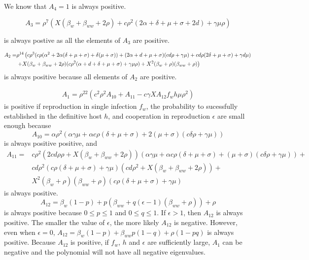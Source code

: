 \documentclass[11pt]{article}
\begin{document}
We know that $A_4 = 1$ is always positive. 

\begin{equation}
	A_3 = \rho ^7 \left(X (\beta_w + \beta_{ww}+2 \rho ) + c \rho^2  (2 \alpha +\delta +\mu +\sigma + 2 d  )+\gamma  \mu  \rho \right)
\end{equation}

is always postive as all the elements of $A_3$ are positive.

\begin{align}
	A_2 = & \rho^{14} \left(c \rho ^3 (c \rho  (\alpha ^2+2 \alpha  (\delta +\mu +\sigma )+\delta  (\mu +\sigma ))+(2 \alpha +d+\mu +\sigma ) (c d \rho +\gamma  \mu )+c d \rho  (2 \delta +\mu +\sigma )+\gamma  d \mu ) \right. \notag \\
	&\left. +X (\beta_w + \beta_{ww}+2 \rho ) (c \rho ^2 (\alpha +d+\delta +\mu +\sigma )+\gamma  \mu  \rho )+X^2 (\beta_w+\rho ) (\beta_{ww}+\rho )\right)
\end{align}
is always positive because all elements of $A_2$ are positive.

\begin{align}
	A_1 =  \rho ^{22} \left(c^2 \rho ^2 A_{10} +A_{11}-c \gamma  X  A_{12} f_w h \mu  \rho ^2 \right)
\end{align}
is positive if reproduction in single infection $f_w$, the probability to sucessfully established in the definitive host $h$, and cooperation in reproduction $\epsilon$ are small enough because 
\begin{equation}
	A_{10} = \alpha  \rho ^2 (\alpha  \gamma  \mu +\alpha  c \rho  (\delta +\mu +\sigma )+2 (\mu +\sigma ) (c \delta  \rho +\gamma  \mu ))
\end{equation}
is always positive positive, and
\begin{align}
	A_{11} = & c \rho ^2 (2 c d \rho  \rho + X (\beta_w + \beta_{ww}+2 \rho )) (\alpha  \gamma  \mu +\alpha  c \rho  (\delta +\mu +\sigma ) +  (\mu +\sigma ) (c \delta  \rho +\gamma  \mu )) + \\
	& c d \rho ^2 (c \rho  (\delta +\mu +\sigma )+\gamma  \mu ) (c d \rho ^2+X (\beta_w+\beta_{ww}+2 \rho )) + \\
	& X^2 (\beta_w+\rho ) (\beta_{ww}+\rho ) (c \rho  (\delta +\mu +\sigma )+\gamma  \mu )
\end{align}
is always positive.
\begin{equation}
	A_{12} =\beta_w (1-p)+p (\beta_{ww}+q (\epsilon -1) (\beta_{ww}+\rho ))+\rho
\end{equation}
is always positive because $0 \leq p \leq 1$ and $0 \leq q \leq 1$. If $\epsilon > 1$, then $A_{12}$ is always positive. The smaller the value of $\epsilon$, the more likely $A_{12}$ is negative. However, even when $\epsilon = 0$, $A_{12} = \beta_w (1-p) + \beta_{ww} p (1-q)+\rho  (1-p q)$ is always positive.
Because $A_{12}$ is positive, if $f_w$, $h$ and $\epsilon$ are sufficiently large, $A_1$ can be negative and the polynomial will not have all negative eigenvalues.
\end{document}
